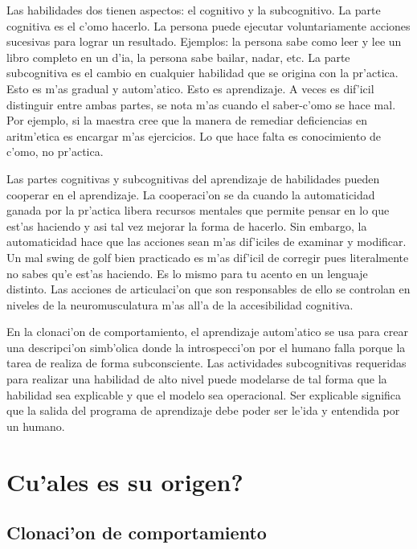 \documentclass[11pt]{article}
\begin{document}
Las habilidades dos tienen aspectos: el cognitivo y la subcognitivo. La parte cognitiva es el c'omo hacerlo. La persona puede ejecutar voluntariamente acciones sucesivas para lograr un resultado. Ejemplos: la persona sabe como leer y lee un libro completo en un d'ia, la persona sabe bailar, nadar, etc. La parte subcognitiva es el cambio en cualquier habilidad que se origina con la pr'actica. Esto es m'as gradual y autom'atico. Esto es aprendizaje. A veces es dif'icil distinguir entre ambas partes, se nota m'as cuando el saber-c'omo se hace mal.  Por ejemplo, si la maestra cree que la manera de remediar deficiencias en aritm'etica es encargar m'as ejercicios. Lo que hace falta es conocimiento de c'omo, no pr'actica.

Las partes cognitivas y subcognitivas del aprendizaje de habilidades pueden cooperar en el aprendizaje. La cooperaci'on se da cuando la automaticidad ganada por la pr'actica libera recursos mentales que permite pensar en lo que est'as haciendo y asi tal vez mejorar la forma de hacerlo. Sin embargo, la automaticidad hace que las acciones sean m'as dif'iciles de examinar y modificar. Un mal swing de golf bien practicado es m'as dif'icil de corregir pues literalmente no sabes qu'e est'as haciendo. Es lo mismo para tu acento en un lenguaje distinto. Las acciones de articulaci'on que son responsables de ello se controlan en niveles de la neuromusculatura m'as all'a de la accesibilidad cognitiva.

En la clonaci'on de comportamiento, el aprendizaje autom'atico se usa para crear una descripci'on simb'olica donde la introspecci'on por el humano falla porque la tarea de realiza de forma subconsciente. Las actividades subcognitivas requeridas para realizar una habilidad de alto nivel puede modelarse de tal forma que la habilidad sea explicable y que el modelo sea operacional. Ser explicable significa que la salida del programa de aprendizaje debe poder ser le'ida y entendida por un humano.

\section {\textquestiondown Cu'ales es su origen?}
\subsection{Clonaci'on de comportamiento}
\end{document}
